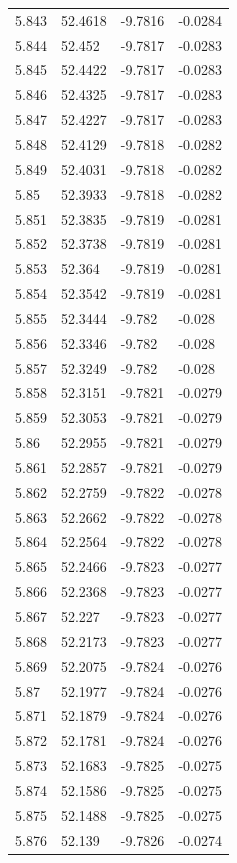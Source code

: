 \begin{tabular}{llll}
5.843 & 52.4618 & -9.7816 & -0.0284 \\
5.844 & 52.452 & -9.7817 & -0.0283 \\
5.845 & 52.4422 & -9.7817 & -0.0283 \\
5.846 & 52.4325 & -9.7817 & -0.0283 \\
5.847 & 52.4227 & -9.7817 & -0.0283 \\
5.848 & 52.4129 & -9.7818 & -0.0282 \\
5.849 & 52.4031 & -9.7818 & -0.0282 \\
5.85 & 52.3933 & -9.7818 & -0.0282 \\
5.851 & 52.3835 & -9.7819 & -0.0281 \\
5.852 & 52.3738 & -9.7819 & -0.0281 \\
5.853 & 52.364 & -9.7819 & -0.0281 \\
5.854 & 52.3542 & -9.7819 & -0.0281 \\
5.855 & 52.3444 & -9.782 & -0.028 \\
5.856 & 52.3346 & -9.782 & -0.028 \\
5.857 & 52.3249 & -9.782 & -0.028 \\
5.858 & 52.3151 & -9.7821 & -0.0279 \\
5.859 & 52.3053 & -9.7821 & -0.0279 \\
5.86 & 52.2955 & -9.7821 & -0.0279 \\
5.861 & 52.2857 & -9.7821 & -0.0279 \\
5.862 & 52.2759 & -9.7822 & -0.0278 \\
5.863 & 52.2662 & -9.7822 & -0.0278 \\
5.864 & 52.2564 & -9.7822 & -0.0278 \\
5.865 & 52.2466 & -9.7823 & -0.0277 \\
5.866 & 52.2368 & -9.7823 & -0.0277 \\
5.867 & 52.227 & -9.7823 & -0.0277 \\
5.868 & 52.2173 & -9.7823 & -0.0277 \\
5.869 & 52.2075 & -9.7824 & -0.0276 \\
5.87 & 52.1977 & -9.7824 & -0.0276 \\
5.871 & 52.1879 & -9.7824 & -0.0276 \\
5.872 & 52.1781 & -9.7824 & -0.0276 \\
5.873 & 52.1683 & -9.7825 & -0.0275 \\
5.874 & 52.1586 & -9.7825 & -0.0275 \\
5.875 & 52.1488 & -9.7825 & -0.0275 \\
5.876 & 52.139 & -9.7826 & -0.0274 \\

\end{tabular}
